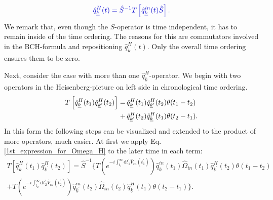 \documentclass[12pt, titlepage]{article}
\begin{document}
 \begin{equation}\label{Gell_Mann-Low_for_one_Q}
\begin{split}
 \textcolor[RGB]{0,0,204}{
\hat{q}^{H}_{\underline{k}}(t)
=
\hat{S}^{-1} 
T
\left[ 
\hat{q}^{in}_{\underline{k}}(t)
\hat{S}
\right]
.
}
\end{split}
\end{equation}
We remark that, even though the $ \hat{S} $-operator is time independent, it has to remain inside of the time ordering. The reasons for this are commutators involved in the BCH-formula and repositioning $ \hat{q}^{H}_{\underline{k}}(t) $. Only the overall time ordering ensures them to be zero.

Next, consider the case with more than one $ \hat{q}^{H}_{\underline{k}} $-operator. We begin with two operators in the Heisenberg-picture on left side in chronological time ordering.
\begin{equation}
\begin{split}
T\left[
\hat{q}^{H}_{\underline{k}}(t_1)
\hat{q}^{H}_{\underline{k}^{\prime}}(t_2)
\right]
=&
\thinspace
\hat{q}^{H}_{\underline{k}}(t_1)
\hat{q}^{H}_{\underline{k}^{\prime}}(t_2)
\theta(t_{1}-t_{2})
\\
\thinspace\thinspace
+&
\thinspace
\hat{q}^{H}_{\underline{k}^{\prime}}(t_2)
\hat{q}^{H}_{\underline{k}}(t_1)
\theta(t_{2}-t_{1})
.
\end{split}
\end{equation}
In this form the following steps can be visualized and extended to the product of more operators, much easier. At first we apply Eq.\enskip\eqref{1st_expression_for_Omega_H} to the later time in each term:
\begin{equation}
\begin{split}
T\left[
\hat{q}^{H}_{\underline{k}}(t_1)
\hat{q}^{H}_{\underline{k}^{\prime}}(t_2)
\right]
=
\hat{S}^{-1}
\Big\{
T\left(  e^{-i\int_{t_{1}}^{\infty}\mathrm{d}t^{\prime}_{1} \hat{V}_{in}(t_{1}^{\prime})}\right)\hat{q}^{in}_{\underline{k}}(t_1)\hat{\Omega}_{in}(t_1) \hat{q}^{H}_{\underline{k}^{\prime}}(t_2)   \theta(t_1 - t_2)
		\\
    + T\left(  e^{-i\int_{t_{2}}^{\infty}\mathrm{d}t^{\prime}_{2} \hat{V}_{in}(t_{2}^{\prime})}\right)\hat{q}^{in}_{\underline{k}^{\prime}}(t_2)\hat{\Omega}_{in}(t_2) 
      \hat{q}^{H}_{\underline{k}}(t_1)   \theta(t_2 - t_1)
    \Big\}
    .  
    \end{split} 
\end{equation}
\end{document}
